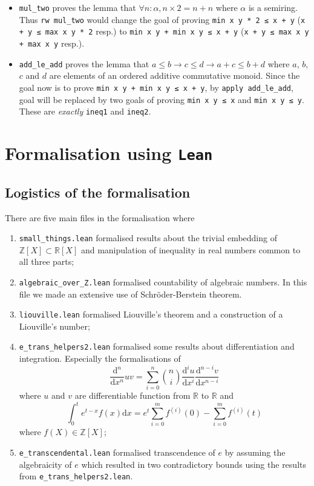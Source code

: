 \documentclass{report}
\theoremstyle{definition}
\theoremstyle{plain}
\begin{document}
\begin{itemize}
  \item {\tt mul\_two} proves the lemma that $\forall n:\alpha, n\times 2 = n+n$ where $\alpha$ is a semiring. Thus {\tt rw mul\_two} would change the goal of proving {\tt min x y * 2 ≤ x + y} ({\tt x + y ≤ max x y * 2} resp.) to {\tt min x y + min x y ≤ x + y} ({\tt x + y ≤ max x y + max x y} resp.).
  \item {\tt add\_le\_add} proves the lemma that $a \le b \to c \le d \to a + c \le b + d$ where $a$, $b$, $c$ and $d$ are elements of an ordered additive commutative monoid. Since the goal now is to prove {\tt min x y + min x y ≤ x + y}, by {\tt apply add\_le\_add}, goal will be replaced by two goals of proving {\tt min x y ≤ x} and {\tt min x y ≤ y}. These are {\it exactly} {\tt ineq1} and {\tt ineq2}.
\end{itemize}

\chapter{Formalisation using {\tt Lean}}\label{fmlsn}
\section*{Logistics of the formalisation}
There are five main files in the formalisation where 
\begin{enumerate}
\item {\tt small\_things.lean} formalised results about the trivial embedding of $\mathbb Z[X]\subset \mathbb R[X]$ and manipulation of inequality in real numbers common to all three parts;
\item {\tt algebraic\_over\_Z.lean} formalised countability of algebraic numbers. In this file we made an extensive use of Schröder-Berstein theorem.
\item {\tt liouville.lean} formalised Liouville's theorem and a construction of a Liouville's number;
\item {\tt e\_trans\_helpers2.lean} formalised some results about differentiation and integration. Especially the formalisations of 
$$
\frac{\mathrm d^n}{\mathrm d x^n}uv = \sum_{i=0}^n{n \choose i}\frac{\mathrm d^i u}{\mathrm d x^i}\frac{\mathrm d^{n-i} v}{\mathrm d x^{n-i}}
$$ where $u$ and $v$ are differentiable function from $\mathbb R$ to $\mathbb R$ and
$$
\int_0^t e^{t-x}f(x)\mathrm{d}x=e^t\sum_{i=0}^m f^{(i)}(0)-\sum_{i=0}^m f^{(i)}(t)
$$ where $f(X)\in\mathbb Z[X]$;
\item {\tt e\_transcendental.lean} formalised transcendence of $e$ by assuming the algebraicity of $e$ which resulted in two contradictory bounds using the results from {\tt e\_trans\_helpers2.lean}.
\end{enumerate}
\end{document}

